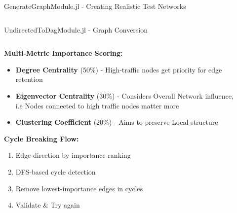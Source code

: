 \documentclass[aspectratio=169]{beamer}
\begin{document}
\begin{frame}{\textcolor{juliagreen}{GenerateGraphModule.jl - Creating Realistic Test Networks}}
\begin{columns}
\begin{column}{0.42\textwidth}

\end{column}
\end{columns}
\end{frame}

\begin{frame}{\textcolor{juliagreen}{UndirectedToDagModule.jl - Graph Conversion}}
\begin{columns}
\begin{column}{0.53\textwidth}
\textbf{Multi-Metric Importance Scoring:}
\begin{itemize}
\item \textcolor{green!70!black}{\textbf{Degree Centrality}} (50\%) - High-traffic nodes get priority for edge retention
\item \textcolor{green!70!black}{\textbf{Eigenvector Centrality}} (30\%) - Considers Overall Network influence, i.e Nodes connected to high traffic nodes matter more
\item \textcolor{green!70!black}{\textbf{Clustering Coefficient}} (20\%) - Aims to preserve Local structure
\end{itemize}
\vspace{0.3cm}
\textbf{Cycle Breaking Flow:}
\begin{enumerate}
\item Edge direction by importance ranking
\item DFS-based cycle detection
\item Remove lowest-importance edges in cycles
\item Validate \& Try again
\end{enumerate}
\end{column}
\begin{column}{0.47\textwidth}
\centering
{}
\end{column}
\end{columns}
\end{frame}
\end{document}

